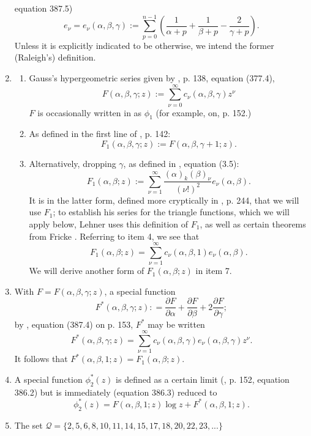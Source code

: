 \documentclass{article}
\begin{document}
\begin{enumerate}
equation 387.5)
$$
e_{\nu} = e_{\nu}(\alpha, \beta, \gamma) :=  
\sum_{p = 0}^{n - 1}
\left ( \frac 1{\alpha + p} + 
\frac 1{\beta + p} 
- \frac 2{\gamma + p} \right ).
$$ Unless it
is explicitly indicated to be
otherwise, we intend the former (Raleigh's)
definition.
\item 
\begin{enumerate}
    \item Gauss's hypergeometric series
given by \cite{caratheodory2}, p. 138,
equation (377.4),
$$
F(\alpha,\beta,\gamma;z):=
\sum_{{\nu}=0}^{\infty} 
c_{\nu}(\alpha, \beta, \gamma) z^{\nu}$$
$F$ is occasionally written in 
\cite{caratheodory2} as $\phi_1$ (for
example, on, p. 152.)
    \item As
    defined in the first line of
\cite{caratheodory2}, p. 142:
$$
F_1(\alpha,\beta,\gamma; z):=
F(\alpha,\beta,\gamma+1;z).
$$
\item Alternatively,
    dropping $\gamma$, as defined in 
    \cite{leo2008fourier}, equation (3.5):
$$
F_1(\alpha,\beta;z):= 
\sum_{\nu=1}^{\infty}
\frac{(\alpha)_k(\beta)_{\nu}}{(\nu!)^2}
e_{\nu}(\alpha, \beta).$$
It is in the latter form, defined
more cryptically in \cite{lehner1954note}, p. 244,
that we will use $F_1$; to
establish his series for the triangle functions,
which we will apply below,
Lehner uses this definition of
$F_1$, as well as certain 
theorems from  Fricke
\cite{fricke1922elliptischen}.
Referring to item 4, we see that
$$
F_1(\alpha,\beta;z)= 
\sum_{\nu=1}^{\infty}
c_{\nu}(\alpha,\beta,1)
e_{\nu}(\alpha, \beta).$$
We will derive another form of $F_1(\alpha,\beta;z)$
in item 7.
\end{enumerate}
\item With 
$F = F(\alpha, \beta, \gamma;z)$,  
a special function
$$F^*(\alpha, \beta, \gamma;z): = 
\frac{\partial F}{\partial \alpha} + 
\frac{\partial F}{\partial \beta}+ 
2\frac{\partial F}{\partial \gamma};$$
by \cite{caratheodory2}, equation (387.4) on p. 153, 
$F^*$ may be written
$$
F^*(\alpha, \beta, \gamma;z) =
\sum_{{\nu} = 1}^{\infty}
c_{\nu} (\alpha, \beta, \gamma) 
e_{\nu} (\alpha, \beta, \gamma) z^{\nu}.
$$
It follows that $F^*(\alpha, \beta, 1;z) = F_1(\alpha,\beta;z)$.
\item A special  function
$\phi_2^*(z)$ is defined as a certain limit
(\cite{caratheodory2},
p. 152, equation 386.2)
but is immediately (equation 386.3) 
reduced to 
$$\phi_2^*(z) =  
F(\alpha, \beta, 1;z) \log z
+ F^*(\alpha, \beta, 1;z).$$
\item The set $\mathscr{Q} 
=\{2,5,6,8,10,11,14,15,17,18,20,22,23,...\}$

\end{enumerate}
\end{document}
